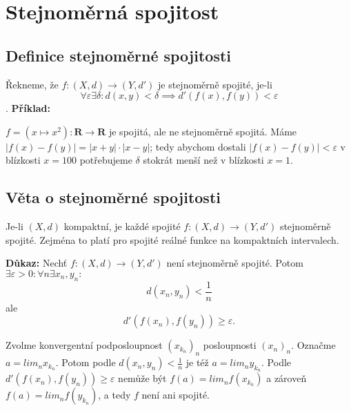 \documentclass[../main.tex]{subfiles}
\begin{document}
\section{Stejnoměrná spojitost}
\subsection{Definice stejnoměrné spojitosti}
\hspace{1.2mm}

Řekneme, že $f : (X,d) \rightarrow (Y,d')$ je stejnoměrně spojité, je-li
\[\forall \varepsilon \exists \delta : d(x,y) < \delta \implies d'(f(x),f(y)) < \varepsilon\].
\noindent
\textbf{Příklad:}

$f = (x \mapsto x^2) : \mathbf{R} \rightarrow \mathbf{R}$ je spojitá, ale ne stejnoměrně spojitá.
Máme $|f(x) - f(y)| = |x+y| \cdot |x-y|$; tedy abychom dostali $|f(x)-f(y)| < \varepsilon $ v 
blízkosti $x = 100$ potřebujeme $\delta$ stokrát menší než v blízkosti $x = 1$.

\subsection{Věta o stejnoměrné spojitosti}
\hspace{1.2mm}
Je-li $(X,d)$ kompaktní, je každé spojité $f : (X,d) \rightarrow (Y,d')$ stejnoměrně spojité. Zejména to platí 
pro spojité reálné funkce na kompaktních intervalech.


\vspace{5mm}
\noindent
\textbf{Důkaz:} Nechť $f : (X,d) \rightarrow (Y,d')$ není stejnoměrně spojité. Potom $\exists \varepsilon > 0 : \forall n \exists x_n, y_n :$
\[d(x_n,y_n) < \frac{1}{n}\]
ale
\[d'(f(x_n),f(y_n)) \geq \varepsilon.\]

Zvolme konvergentní podposloupnost $(x_{k_n})_n$ posloupnosti $(x_n)_n$. Označme $a = lim_n x_{k_n}.$ Potom podle $d(x_n,y_n) < \frac{1}{n}$ je též 
$a = lim_n y_{k_n}.$ Podle $d'(f(x_n),f(y_n)) \geq \varepsilon$ nemůže být $f(a) = lim_n f(x_{k_n})$ a zároveň $f(a) = lim_n f(y_{k_n})$, 
a tedy $f$ není ani spojité.
\end{document}

